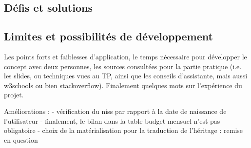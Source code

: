 \documentclass[a4paper,12pt]{article}
\begin{document}
\subsection{Défis et solutions}
\subsection{Limites et possibilités de développement}
Les points forts et faiblesses d’application, le temps nécessaire pour développer le concept avec deux personnes, les sources consultées pour la partie pratique (i.e. les slides, ou techniques vues au TP, ainsi que les conseils d’assistante, mais aussi w3schools ou bien stackoverflow).
Finalement quelques mots sur l'expérience du projet.

Améliorations : 
- vérification du niss par rapport à la date de naissance de l'utilisateur
- finalement, le bilan dans la table budget mensuel n'est pas obligatoire
- choix de la matérialisation pour la traduction de l'héritage : remise en question




\newpage

%
%

\end{document}
